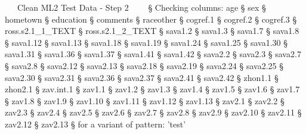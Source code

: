 \documentclass[]{article}
\newenvironment{Shaded}{\begin{snugshade}}{\end{snugshade}}
\newcommand{\DecValTok}[1]{\textcolor[rgb]{0.86,0.86,0.80}{{#1}}}
\newcommand{\FloatTok}[1]{\textcolor[rgb]{0.75,0.75,0.82}{{#1}}}
\newcommand{\StringTok}[1]{\textcolor[rgb]{0.80,0.58,0.58}{{#1}}}
\newcommand{\ErrorTok}[1]{\textcolor[rgb]{0.76,0.75,0.62}{{#1}}}
\newcommand{\NormalTok}[1]{\textcolor[rgb]{0.80,0.80,0.80}{{#1}}}
\begin{document}
\begin{Shaded}
\begin{Highlighting}[]
    \NormalTok{~}\ErrorTok{~~}\NormalTok{Clean ML2 Test Data -}\StringTok{ }\NormalTok{Step }\DecValTok{2}\NormalTok{~}\ErrorTok{~~~}
\StringTok{    }\NormalTok{§ Checking columns:}
\StringTok{         }\NormalTok{age}
    \NormalTok{§    sex}
    \NormalTok{§    hometown}
    \NormalTok{§    education}
    \NormalTok{§    comments}
    \NormalTok{§    raceother}
    \NormalTok{§    cogref}\FloatTok{.1}
    \NormalTok{§    cogref}\FloatTok{.2}
    \NormalTok{§    cogref}\FloatTok{.3}
    \NormalTok{§    ross.s2.1_1_TEXT}
    \NormalTok{§    ross.s2.1_2_TEXT}
    \NormalTok{§    sava1}\FloatTok{.2}
    \NormalTok{§    sava1}\FloatTok{.3}
    \NormalTok{§    sava1}\FloatTok{.7}
    \NormalTok{§    sava1}\FloatTok{.8}
    \NormalTok{§    sava1}\FloatTok{.12}
    \NormalTok{§    sava1}\FloatTok{.13}
    \NormalTok{§    sava1}\FloatTok{.18}
    \NormalTok{§    sava1}\FloatTok{.19}
    \NormalTok{§    sava1}\FloatTok{.24}
    \NormalTok{§    sava1}\FloatTok{.25}
    \NormalTok{§    sava1}\FloatTok{.30}
    \NormalTok{§    sava1}\FloatTok{.31}
    \NormalTok{§    sava1}\FloatTok{.36}
    \NormalTok{§    sava1}\FloatTok{.37}
    \NormalTok{§    sava1}\FloatTok{.41}
    \NormalTok{§    sava1}\FloatTok{.42}
    \NormalTok{§    sava2}\FloatTok{.2}
    \NormalTok{§    sava2}\FloatTok{.3}
    \NormalTok{§    sava2}\FloatTok{.7}
    \NormalTok{§    sava2}\FloatTok{.8}
    \NormalTok{§    sava2}\FloatTok{.12}
    \NormalTok{§    sava2}\FloatTok{.13}
    \NormalTok{§    sava2}\FloatTok{.18}
    \NormalTok{§    sava2}\FloatTok{.19}
    \NormalTok{§    sava2}\FloatTok{.24}
    \NormalTok{§    sava2}\FloatTok{.25}
    \NormalTok{§    sava2}\FloatTok{.30}
    \NormalTok{§    sava2}\FloatTok{.31}
    \NormalTok{§    sava2}\FloatTok{.36}
    \NormalTok{§    sava2}\FloatTok{.37}
    \NormalTok{§    sava2}\FloatTok{.41}
    \NormalTok{§    sava2}\FloatTok{.42}
    \NormalTok{§    zhon1}\FloatTok{.1}
    \NormalTok{§    zhon2}\FloatTok{.1}
    \NormalTok{§    zav.int}\FloatTok{.1}
    \NormalTok{§    zav1}\FloatTok{.1}
    \NormalTok{§    zav1}\FloatTok{.2}
    \NormalTok{§    zav1}\FloatTok{.3}
    \NormalTok{§    zav1}\FloatTok{.4}
    \NormalTok{§    zav1}\FloatTok{.5}
    \NormalTok{§    zav1}\FloatTok{.6}
    \NormalTok{§    zav1}\FloatTok{.7}
    \NormalTok{§    zav1}\FloatTok{.8}
    \NormalTok{§    zav1}\FloatTok{.9}
    \NormalTok{§    zav1}\FloatTok{.10}
    \NormalTok{§    zav1}\FloatTok{.11}
    \NormalTok{§    zav1}\FloatTok{.12}
    \NormalTok{§    zav1}\FloatTok{.13}
    \NormalTok{§    zav2}\FloatTok{.1}
    \NormalTok{§    zav2}\FloatTok{.2}
    \NormalTok{§    zav2}\FloatTok{.3}
    \NormalTok{§    zav2}\FloatTok{.4}
    \NormalTok{§    zav2}\FloatTok{.5}
    \NormalTok{§    zav2}\FloatTok{.6}
    \NormalTok{§    zav2}\FloatTok{.7}
    \NormalTok{§    zav2}\FloatTok{.8}
    \NormalTok{§    zav2}\FloatTok{.9}
    \NormalTok{§    zav2}\FloatTok{.10}
    \NormalTok{§    zav2}\FloatTok{.11}
    \NormalTok{§    zav2}\FloatTok{.12}
    \NormalTok{§    zav2}\FloatTok{.13}
    \NormalTok{§ for a variant of pattern:}\StringTok{ 'test'}
    

\end{Highlighting}
\end{Shaded}
\end{document}
